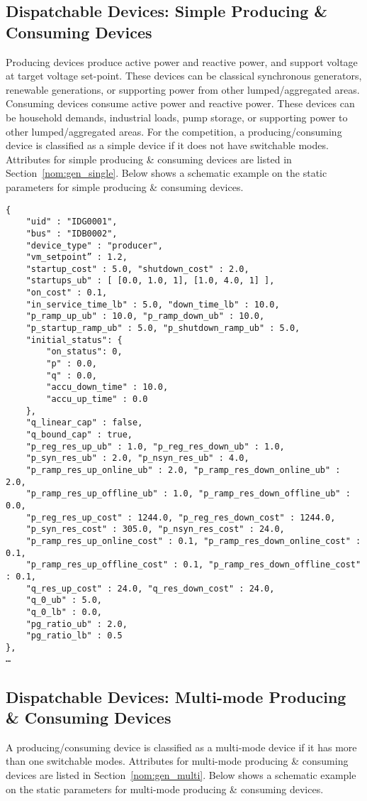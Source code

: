 \subsection{Dispatchable Devices: Simple Producing \& Consuming Devices}
\label{sec:generator}
Producing devices
produce active power and reactive power, and support voltage at target voltage set-point.
These devices can be classical synchronous generators, renewable generations, or supporting 
power from other lumped/aggregated areas. 
Consuming devices consume active power and reactive power.
These devices can be household demands, industrial loads, pump storage, or
supporting power to other lumped/aggregated areas. 
For the competition, a producing/consuming device is classified as a simple device if it
does not have switchable modes.
Attributes for simple producing \& consuming devices are listed in Section~\ref{nom:gen_single}.
Below shows a schematic example on the static parameters for simple producing \& consuming devices.

\begin{verbatim}
{
    "uid" : "IDG0001",
    "bus" : "IDB0002",
    "device_type" : "producer",
    "vm_setpoint” : 1.2,
    "startup_cost" : 5.0, "shutdown_cost" : 2.0,
    "startups_ub" : [ [0.0, 1.0, 1], [1.0, 4.0, 1] ],
    "on_cost" : 0.1,
    "in_service_time_lb" : 5.0, "down_time_lb" : 10.0,
    "p_ramp_up_ub" : 10.0, "p_ramp_down_ub" : 10.0, 
    "p_startup_ramp_ub" : 5.0, "p_shutdown_ramp_ub" : 5.0,
    "initial_status": {
        "on_status": 0,
        "p" : 0.0,
        "q" : 0.0,
        "accu_down_time" : 10.0,
        "accu_up_time" : 0.0
    },
    "q_linear_cap" : false, 
    "q_bound_cap" : true, 
    "p_reg_res_up_ub" : 1.0, "p_reg_res_down_ub" : 1.0,
    "p_syn_res_ub" : 2.0, "p_nsyn_res_ub" : 4.0, 
    "p_ramp_res_up_online_ub" : 2.0, "p_ramp_res_down_online_ub" : 2.0,
    "p_ramp_res_up_offline_ub" : 1.0, "p_ramp_res_down_offline_ub" : 0.0,
    "p_reg_res_up_cost" : 1244.0, "p_reg_res_down_cost" : 1244.0,
    "p_syn_res_cost" : 305.0, "p_nsyn_res_cost" : 24.0, 
    "p_ramp_res_up_online_cost" : 0.1, "p_ramp_res_down_online_cost" : 0.1,
    "p_ramp_res_up_offline_cost" : 0.1, "p_ramp_res_down_offline_cost" : 0.1,
    "q_res_up_cost" : 24.0, "q_res_down_cost" : 24.0,
    "q_0_ub" : 5.0,
    "q_0_lb" : 0.0,
    "pg_ratio_ub" : 2.0,
    "pg_ratio_lb" : 0.5    
},
…     
\end{verbatim}

\subsection{Dispatchable Devices: Multi-mode Producing \& Consuming Devices}
\label{sec:multi-generator}
A producing/consuming device is classified as a multi-mode device if it
has more than one switchable modes.
Attributes for multi-mode producing \& consuming devices are listed in Section~\ref{nom:gen_multi}.
Below shows a schematic example on the static parameters for multi-mode producing \& consuming devices.


